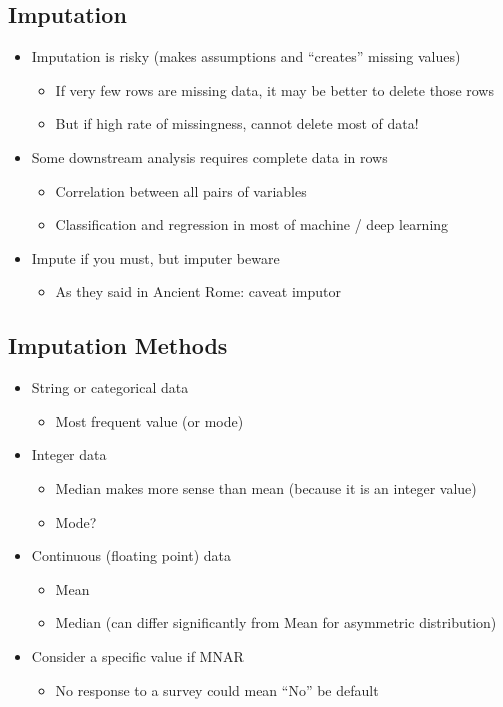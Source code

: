 \documentclass[11pt]{article}
\theoremstyle{definition}
\begin{document}
\subsection{Imputation}
\begin{itemize}
    \item Imputation is risky (makes assumptions and “creates” missing values)
    \begin{itemize}
        \item If very few rows are missing data, it may be better to delete those rows
        \item But if high rate of missingness, cannot delete most of data!
    \end{itemize}
    \item Some downstream analysis requires complete data in rows
    \begin{itemize}
        \item Correlation between all pairs of variables
        \item Classification and regression in most of machine / deep learning
    \end{itemize}
    \item Impute if you must, but imputer beware
    \begin{itemize}
        \item As they said in Ancient Rome: caveat imputor
    \end{itemize}
\end{itemize}
\subsection{Imputation Methods}
\begin{itemize}
    \item String or categorical data
    \begin{itemize}
        \item Most frequent value (or mode)
    \end{itemize}
    \item Integer data
    \begin{itemize}
        \item Median makes more sense than mean (because it is an integer value)
        \item Mode?
    \end{itemize}
    \item Continuous (floating point) data
    \begin{itemize}
        \item Mean
        \item Median (can differ significantly from Mean for asymmetric distribution)
    \end{itemize}
    \item Consider a specific value if MNAR
    \begin{itemize}
        \item No response to a survey could mean “No” be default
    \end{itemize}
\end{itemize}
\end{document}
